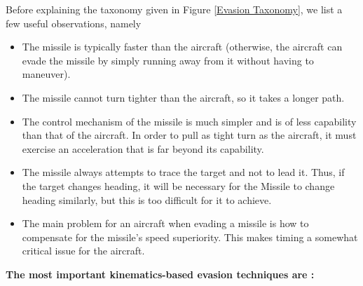Before explaining the taxonomy given in Figure \ref{Evasion Taxonomy}, we list a few useful observations, namely  
\begin{itemize}
	\item The missile is typically faster than the aircraft (otherwise, the aircraft can evade the missile by simply running away from it without having to maneuver).
	\item The missile cannot turn tighter than the aircraft, so it takes a longer path.
	\item The control mechanism of the missile is much simpler and is of less capability than that of the aircraft. In order to pull as tight turn as the aircraft, it must exercise an acceleration that is far beyond its capability.
	\item The missile always attempts to trace the target and not to lead it. Thus, if the target changes heading, it will be necessary for the Missile to change heading similarly, but this is too difficult for it to achieve.
	\item  The main problem for an aircraft when evading a missile is how to compensate for the missile's speed superiority. This makes timing a somewhat critical issue for the aircraft.
\end{itemize}
\textbf{The most important kinematics-based evasion techniques are :}
